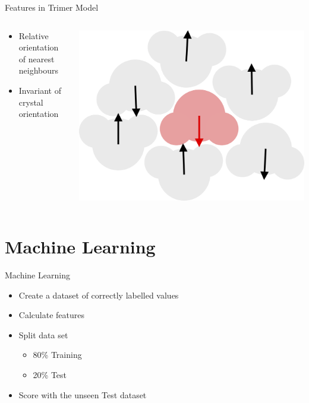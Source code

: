\documentclass[aspectratio=169, 14pt]{beamer}
\begin{document}
\begin{frame}{Features in Trimer Model}

  \begin{columns}
    \begin{column}{0.5\textwidth}
      \begin{itemize}
        \item Relative orientation of nearest neighbours
        \item Invariant of crystal orientation
      \end{itemize}
    \end{column}
    \begin{column}{0.5\textwidth}
      \includegraphics[width=\textwidth]{orientations.png}
    \end{column}
  \end{columns}
\end{frame}


\section{Machine Learning}
\begin{frame}{Machine Learning}

  \begin{itemize}
    \item Create a dataset of correctly labelled values
    \item Calculate features
    \item Split data set
      \begin{itemize}
        \item 80\% Training
        \item 20\% Test
      \end{itemize}
    \item Score with the unseen Test dataset
  \end{itemize}

\end{frame}
\end{document}
